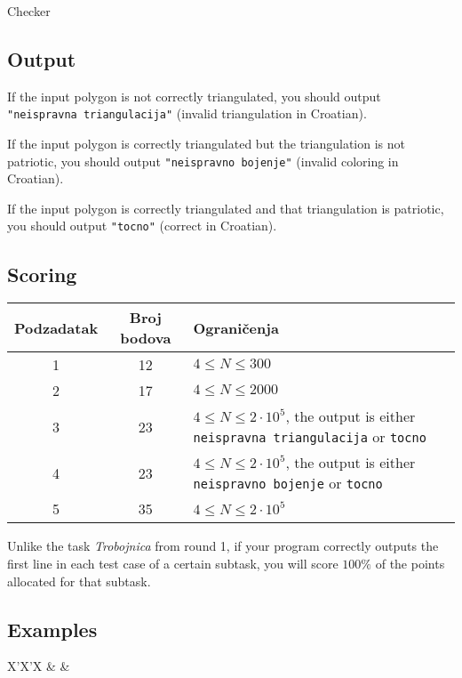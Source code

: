 \begin{statement}[
  problempoints=110,
  timelimit=3 seconds,
  memorylimit=512 MiB,
]{Checker}
\subsection*{Output}
If the input polygon is not correctly triangulated, you should output
\texttt{"neispravna triangulacija"} (invalid triangulation in Croatian).

If the input polygon is correctly triangulated but the triangulation is
not patriotic, you should output \texttt{"neispravno bojenje"} (invalid
coloring in Croatian).

If the input polygon is correctly triangulated and that triangulation is
patriotic, you should output \texttt{"tocno"} (correct in Croatian).

\subsection*{Scoring}
{\renewcommand{\arraystretch}{1.4}
  \setlength{\tabcolsep}{6pt}
  \begin{tabular}{ccl}
 Podzadatak & Broj bodova & Ograničenja \\ \midrule
  1 & 12 & $4 \le N \le 300$ \\
  2 & 17 & $4 \le N \le 2000$ \\
  3 & 23 & $4 \le N \le 2\cdot10^5$, the output is either \texttt{neispravna triangulacija} or \texttt{tocno} \\
  4 & 23 & $4 \le N \le 2\cdot10^5$, the output is either \texttt{neispravno bojenje} or \texttt{tocno} \\
  5 & 35 & $4 \le N \le 2\cdot10^5$
\end{tabular}}

Unlike the task \textit{Trobojnica} from round 1, if your program correctly
outputs the first line in each test case of a certain subtask, you will score
$100\%$ of the points allocated for that subtask.

\subsection*{Examples}
\begin{tabularx}{\textwidth}{X'X'X}
 &
 &
\end{tabularx}

\end{statement}

